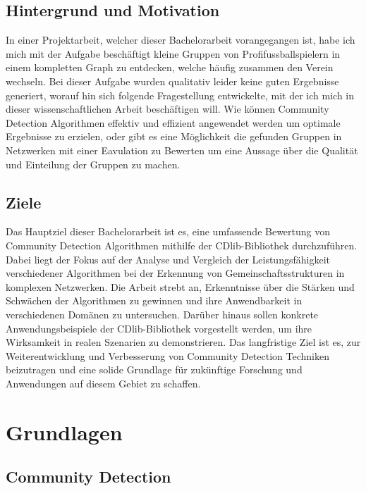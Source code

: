 \section{Hintergrund und Motivation}\label{Hintergrund und Motivation}
In einer Projektarbeit, welcher dieser Bachelorarbeit vorangegangen ist, habe ich mich mit der Aufgabe beschäftigt kleine Gruppen von Profifussballspielern in  einem kompletten Graph zu entdecken, welche häufig zusammen den Verein wechseln. Bei dieser Aufgabe wurden qualitativ leider keine guten Ergebnisse generiert, worauf hin sich folgende Fragestellung  entwickelte, mit der ich mich in dieser wissenschaftlichen Arbeit beschäftigen will. Wie können Community Detection Algorithmen effektiv und effizient angewendet werden um optimale Ergebnisse zu erzielen, oder gibt es eine Möglichkeit die gefunden Gruppen in Netzwerken mit einer Eavulation zu Bewerten um eine Aussage über die Qualität und Einteilung der Gruppen zu machen.

\section{Ziele}\label{Ziele}
Das Hauptziel dieser Bachelorarbeit ist es, eine umfassende Bewertung von Community Detection Algorithmen mithilfe der CDlib-Bibliothek durchzuführen. Dabei liegt der Fokus auf der Analyse und Vergleich der Leistungsfähigkeit verschiedener Algorithmen bei der Erkennung von Gemeinschaftsstrukturen in komplexen Netzwerken. Die Arbeit strebt an, Erkenntnisse über die Stärken und Schwächen der Algorithmen zu gewinnen und ihre Anwendbarkeit in verschiedenen Domänen zu untersuchen. Darüber hinaus sollen konkrete Anwendungsbeispiele der CDlib-Bibliothek vorgestellt werden, um ihre Wirksamkeit in realen Szenarien zu demonstrieren. Das langfristige Ziel ist es, zur Weiterentwicklung und Verbesserung von Community Detection Techniken beizutragen und eine solide Grundlage für zukünftige Forschung und Anwendungen auf diesem Gebiet zu schaffen.

\chapter{Grundlagen}

\section{Community Detection}\label{Community Detection}

